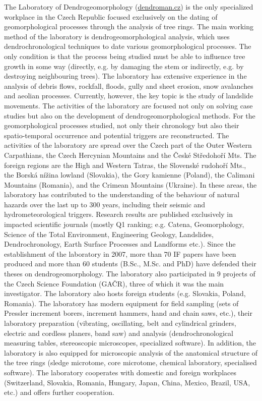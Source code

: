 {The Laboratory of Dendrogeomorphology (\url{dendroman.cz}) is the only specialized workplace in the Czech Republic focused exclusively on the dating of geomorphological processes through the analysis of tree rings. The main working method of the laboratory is dendrogeomorphological analysis, which uses dendrochronological techniques to date various geomorphological processes. The only condition is that the process being studied must be able to influence tree growth in some way (directly, e.g. by damaging the stem or indirectly, e.g. by destroying neighbouring trees). The laboratory has extensive experience in the analysis of debris flows, rockfall, floods, gully and sheet erosion, snow avalanches and aeolian processes. Currently, however, the key topic is the study of landslide movements. The activities of the laboratory are focused not only on solving case studies but also on the development of dendrogeomorphological methods. For the geomorphological processes studied, not only their chronology but also their spatio-temporal occurrence and potential triggers are reconstructed. The activities of the laboratory are spread over the Czech part of the Outer Western Carpathians, the Czech Hercynian Mountains and the České Středohoří Mts. The foreign regions are the High and Western Tatras, the Slovenské rudohoří Mts., the Borská nížina lowland (Slovakia), the Gory kamienne (Poland), the Calimani Mountains (Romania), and the Crimean Mountains (Ukraine). In these areas, the laboratory has contributed to the understanding of the behaviour of natural hazards over the last up to 300 years, including their seismic and hydrometeorological triggers. Research results are published exclusively in impacted scientific journals (mostly Q1 ranking; e.g. Catena, Geomorphology, Science of the Total Environment, Engineering Geology, Landslides, Dendrochronology, Earth Surface Processes and Landforms etc.). Since the establishment of the laboratory in 2007, more than 70 IF papers have been produced and more than 60 students (B.Sc., M.Sc. and PhD) have defended their theses on dendrogeomorphology. The laboratory also participated in 9 projects of the Czech Science Foundation (GAČR), three of which it was the main investigator. The laboratory also hosts foreign students (e.g. Slovakia, Poland, Romania). The laboratory has modern equipment for field sampling (sets of Pressler increment borers, increment hammers, hand and chain saws, etc.), their laboratory preparation (vibrating, oscillating, belt and cylindrical grinders, electric and cordless planers, band saw) and analysis (dendrochronological measuring tables, stereoscopic microscopes, specialized software). In addition, the laboratory is also equipped for microscopic analysis of the anatomical structure of the tree rings (sledge microtome, core microtome, chemical laboratory, specialised software). The laboratory cooperates with domestic and foreign workplaces (Switzerland, Slovakia, Romania, Hungary, Japan, China, Mexico, Brazil, USA, etc.) and offers further cooperation. 
	
}
